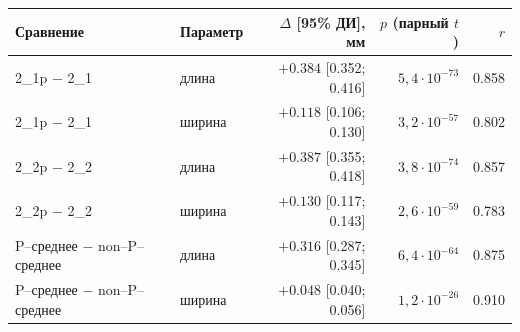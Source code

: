 \begin{tabular}{@{}llrrr@{}}
\toprule
Сравнение & Параметр & $\Delta$ [95\% ДИ], мм & $p$ (парный $t$) & $r$ \\
\midrule
2\_1p $-$ 2\_1 & длина & $+\num{0.384}$ [\num{0.352}; \num{0.416}] & $5{,}4\cdot10^{-73}$ & \num{0.858} \\
2\_1p $-$ 2\_1 & ширина & $+\num{0.118}$ [\num{0.106}; \num{0.130}] & $3{,}2\cdot10^{-57}$ & \num{0.802} \\
2\_2p $-$ 2\_2 & длина & $+\num{0.387}$ [\num{0.355}; \num{0.418}] & $3{,}8\cdot10^{-74}$ & \num{0.857} \\
2\_2p $-$ 2\_2 & ширина & $+\num{0.130}$ [\num{0.117}; \num{0.143}] & $2{,}6\cdot10^{-59}$ & \num{0.783} \\
P--среднее $-$ non--P--среднее & длина & $+\num{0.316}$ [\num{0.287}; \num{0.345}] & $6{,}4\cdot10^{-64}$ & \num{0.875} \\
P--среднее $-$ non--P--среднее & ширина & $+\num{0.048}$ [\num{0.040}; \num{0.056}] & $1{,}2\cdot10^{-26}$ & \num{0.910} \\
\bottomrule
\end{tabular}
